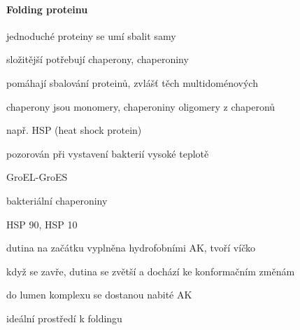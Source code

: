 \documentclass[DIV=8]{scrreprt}
\begin{document}
\paragraph{Folding proteinu}
\begin{myItemize}[nosep]
    \item jednoduché proteiny se umí sbalit samy
    \item složitější potřebují chaperony, chaperoniny
\begin{myItemize}[nosep]
    \item pomáhají sbalování proteinů, zvlášť těch multidoménových
    \item chaperony jsou monomery, chaperoniny oligomery z chaperonů
    \item např. HSP (heat shock protein)
\begin{myItemize}[nosep]
    \item pozorován při vystavení bakterií vysoké teplotě
\end{myItemize}

    \item GroEL-GroES
\begin{myItemize}[nosep]
    \item bakteriální chaperoniny
    \item HSP 90, HSP 10
    \item dutina na začátku vyplněna hydrofobními AK, tvoří víčko
\begin{myItemize}[nosep]
    \item když se zavře, dutina se zvětší a dochází ke konformačním změnám
    \item do lumen komplexu se dostanou nabité AK
\begin{myItemize}[nosep]
    \item ideální prostředí k foldingu
\end{myItemize}

\end{myItemize}

\end{myItemize}

\end{myItemize}

\end{myItemize}
\end{document}

